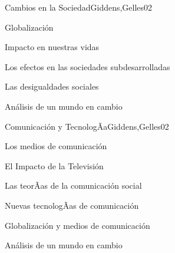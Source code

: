\begin{syllabus}
\begin{unit}{Cambios en la Sociedad}{Giddens,Gelles}{0}{2}
    \begin{topics}
      \item Globalización
      \item Impacto en nuestras vidas
      \item Los efectos en las sociedades subdesarrolladas
      \item Las desigualdades sociales
    \end{topics}
    \begin{unitgoals}
      \item Análisis de un mundo en cambio
    \end{unitgoals}
\end{unit}

\begin{unit}{Comunicación y TecnologÃ­a}{Giddens,Gelles}{0}{2}
    \begin{topics}
      \item Los medios de comunicación
      \item El Impacto de la Televisión
      \item Las teorÃ­as de la comunicación social
      \item Nuevas tecnologÃ­as de comunicación
      \item Globalización y medios de comunicación
    \end{topics}
    \begin{unitgoals}
      \item Análisis de un mundo en cambio
    \end{unitgoals}
\end{unit}



\begin{coursebibliography}
\end{coursebibliography}

\end{syllabus}
